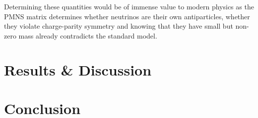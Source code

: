 \documentclass[a4paper,12pt]{article}
\begin{document}
Determining these quantities would be of immense value to modern physics as the PMNS matrix determines whether neutrinos are their own antiparticles, whether they violate charge-parity symmetry and knowing that they have small but non-zero mass already contradicts the standard model.


\newpage


\section{Results \& Discussion}

\section{Conclusion}

\printbibliography
\end{document}
